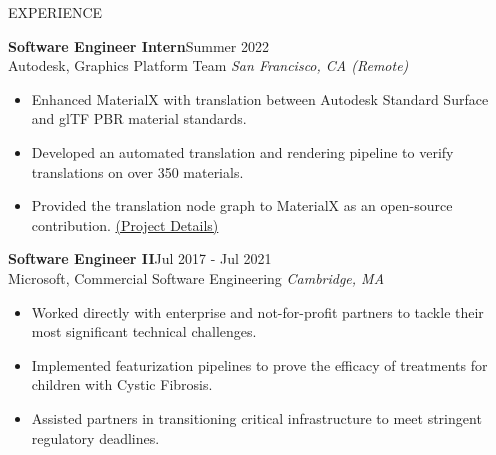 \documentclass{resume}
\begin{document}
\begin{rSection}{EXPERIENCE}

\textbf{Software Engineer Intern}\hfill Summer 2022 \\
Autodesk, Graphics Platform Team \hfill \textit{San Francisco, CA (Remote)}
 \begin{itemize}
    \itemsep -3pt {} 
     \item Enhanced MaterialX with translation between Autodesk Standard Surface and glTF PBR material standards.
     \item Developed an automated translation and rendering pipeline to verify translations on over 350 materials.
    \item Provided the translation node graph to MaterialX as an open-source contribution. \href{https://blog.roblesch.page/blog/2022/09/02/summer-standards.html}{(Project Details)}
 \end{itemize}
 
\textbf{Software Engineer II}\hfill Jul 2017 - Jul 2021 \\
Microsoft, Commercial Software Engineering \hfill \textit{Cambridge, MA}
 \begin{itemize}
    \itemsep -3pt {} 
     \item Worked directly with enterprise and not-for-profit partners to tackle their most significant technical challenges.
     \item Implemented featurization pipelines to prove the efficacy of treatments for children with Cystic Fibrosis.
     \item Assisted partners in transitioning critical infrastructure to meet stringent regulatory deadlines.
 \end{itemize}

\end{rSection}
\end{document}
